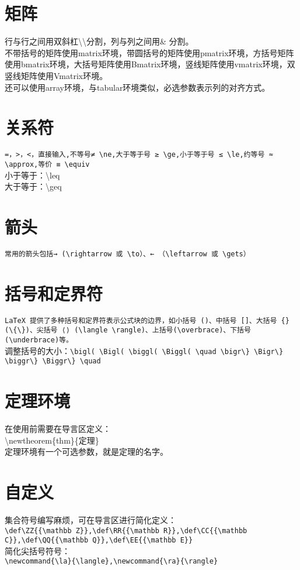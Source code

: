 \documentclass{book}%
\begin{document}
    \section{矩阵}
    行与行之间用双斜杠\textbackslash \textbackslash 分割，列与列之间用\& 分割。\\
    不带括号的矩阵使用matrix环境，带圆括号的矩阵使用pmatrix环境，方括号矩阵使用bmatrix环境，大括号矩阵使用Bmatrix环境，竖线矩阵使用vmatrix环境，双竖线矩阵使用Vmatrix环境。\\
    还可以使用array环境，与tabular环境类似，必选参数表示列的对齐方式。
    
    \section{关系符}
    \verb|=，>，<，直接输入,不等号≠ \ne,大于等于号 ≥ \ge,小于等于号 ≤ \le,约等号 ≈ \approx,等价 ≡ \equiv|\\
    小于等于：\textbackslash leq\\
    大于等于：\textbackslash geq\\
    
    \section{箭头}
    \verb|常用的箭头包括→ (\rightarrow 或 \to）、← （\leftarrow 或 \gets）|\\
    
    \section{括号和定界符}
    \verb|LaTeX 提供了多种括号和定界符表示公式块的边界，如小括号 ()、中括号 []、大括号 {} (\{\})、尖括号 ⟨⟩ (\langle \rangle)、上括号(\overbrace)、下括号(\underbrace)等。|\\
    调整括号的大小：\verb|\bigl( \Bigl( \biggl( \Biggl( \quad \bigr\} \Bigr\} \biggr\} \Biggr\} \quad|\\
    
    \section{定理环境}
    在使用前需要在导言区定义：\\
    \textbackslash newtheorem\{thm\}\{定理\}\\
    定理环境有一个可选参数，就是定理的名字。
    
    \section{自定义}
    集合符号编写麻烦，可在导言区进行简化定义：\\
    \verb|\def\ZZ{{\mathbb Z}},\def\RR{{\mathbb R}},\def\CC{{\mathbb C}},\def\QQ{{\mathbb Q}},\def\EE{{\mathbb E}}|\\
    简化尖括号符号：\\
    \verb|\newcommand{\la}{\langle},\newcommand{\ra}{\rangle}|\\
\end{document}
